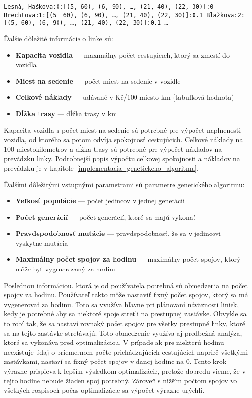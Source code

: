 \noindent \texttt{Lesná, Haškova:0:[(5, 60), (6, 90), \ldots , (21, 40), (22, 30)]:0 \newline
  Brechtova:1:[(5, 60), (6, 90), \ldots , (21, 40), (22, 30)]:0.1 \newline
  Blažkova:2:[(5, 60), (6, 90), \ldots , (21, 40), (22, 30)]:0.1 \newline
  \ldots
}

Ďalšie dôležité informácie o linke sú:
\begin{itemize}
  \item \textbf{Kapacita vozidla} --- maximálny počet cestujúcich, ktorý sa zmestí do vozidla
  \item \textbf{Miest na sedenie} --- počet miest na sedenie v vozidle
  \item \textbf{Celkové náklady} --- udávané v Kč/100 miesto-km (tabuľková hodnota) 
  \item \textbf{Dĺžka trasy} --- dĺžka trasy v km
\end{itemize}
Kapacita vozidla a počet miest na sedenie sú potrebné pre výpočet naplnenosti vozidla, od ktorého sa potom odvíja spokojnosť cestujúcich.
Celkové náklady na 100 miestokilometrov a dĺžka trasy sú potrebné pre výpočet nákladov na prevádzku linky.
Podrobnejší popis výpočtu celkovej spokojnosti a nákladov na prevádzku je v kapitole~\ref{implementacia_genetickeho_algoritmu}.

Ďalšími dôležitými vstupnými parametrami sú parametre genetického algoritmu:
\begin{itemize}
  \item \textbf{Veľkosť populácie} --- počet jedincov v jednej generácii
  \item \textbf{Počet generácií} --- počet generácií, ktoré sa majú vykonať
  \item \textbf{Pravdepodobnosť mutácie} --- pravdepodobnosť, že sa v jedincovi vyskytne mutácia
  \item \textbf{Maximálny počet spojov za hodinu} --- maximálny počet spojov, ktorý môže byť vygenerovaný za hodinu
\end{itemize}
Poslednou informáciou, ktorá je od používateľa potrebná sú obmedzenia na počet spojov za hodinu.
Používateľ takto môže nastaviť fixný počet spojov, ktorý sa má vygenerovať za hodinu.
Toto sa využíva hľavne pri plánovaní náväznosti liniek, kedy je potrebné aby sa niektoré spoje stretli na prestupnej zastávke.
Obvykle sa to robí tak, že sa nastaví rovnaký počet spojov pre všetky prestupné linky, ktoré sa na tejto zastávke stretávajú.
Toto obmedzenie využíva aj predbežná analýza, ktorá sa vykonáva pred optimalizáciou.
V prípade ak pre niektorú hodinu neexistuje údaj o priemernom počte prichádzajúcich cestujúcich naprieč všetkými zastávkami, nastaví sa fixný počet spojov v danej hodine na 0.
Tento krok výrazne prispieva k lepším výsledkom optimalizácie, pretože dopredu vieme, že v tejto hodine nebude žiaden spoj potrebný.
Zároveň s nižším počtom spojov vo všetkých rozpisoch počas optimalizácie sa výpočet výrazne urýchli.

